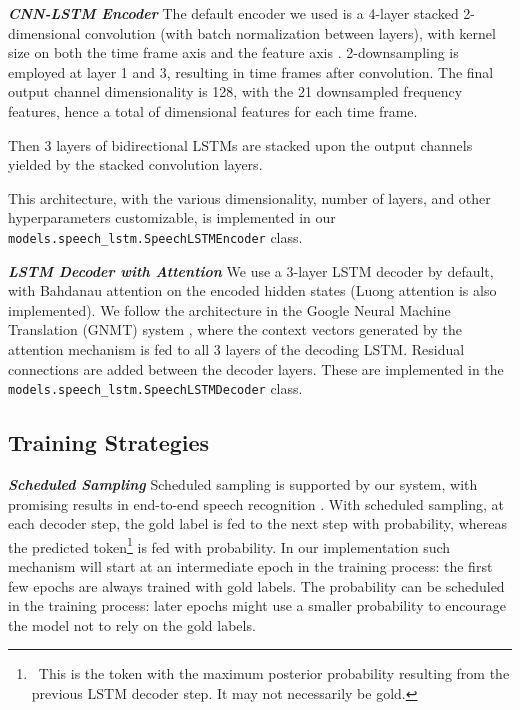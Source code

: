 \documentclass{article}
\begin{document}
\vspace{0.2cm}
\noindent \textbf{\textit{CNN-LSTM Encoder}}\quad
\label{sec:lstm_encoder}
The default encoder we used is a 4-layer stacked 2-dimensional convolution (with batch normalization between layers), with kernel size  on both the time frame axis and the feature axis \cite{zhang2017very,watanabe2018espnet}. 2-downsampling is employed at layer 1 and 3, resulting in  time frames after convolution. The final output channel dimensionality is 128, with the 21 downsampled frequency features, hence a total of  dimensional features for each time frame.

Then 3 layers of bidirectional LSTMs \cite{graves2005bidirectional} are stacked  upon the output channels yielded by the stacked convolution layers.

This architecture, with the various dimensionality, number of layers, and other hyperparameters customizable, is implemented in our \texttt{models.speech\_lstm.SpeechLSTMEncoder} class.

\vspace{0.2cm}
\noindent \textbf{\textit{LSTM Decoder with Attention}}\quad
\label{sec:lstm_decoder}
We use a 3-layer LSTM decoder by default, with Bahdanau attention \cite{bahdanau2015neural} on the encoded hidden states (Luong attention \cite{luong2015effective} is also implemented). We follow the architecture in the Google Neural Machine Translation (GNMT) system \cite{gnmt}, where the context vectors generated by the attention mechanism is fed to all 3 layers of the decoding LSTM. Residual connections \cite{he2016deep} are added between the decoder layers. These are implemented in the \texttt{models.speech\_lstm.SpeechLSTMDecoder} class.

\subsection{Training Strategies}




\vspace{0.2cm}
\noindent \textbf{\textit{Scheduled Sampling}}\quad
Scheduled sampling \cite{bengio2015scheduled} is supported by our system, with promising results in end-to-end speech recognition \cite{baskar2019promising}. With scheduled sampling, at each decoder step, the gold label is fed to the next step with  probability, whereas the predicted token\footnote{~This is the token with the maximum posterior probability resulting from the previous LSTM decoder step. It may not necessarily be gold.} is fed with  probability. In our implementation such mechanism will start at an intermediate epoch  in the training process: the first few epochs are always trained with gold labels. The probability  can be scheduled in the training process: later epochs might use a smaller probability to encourage the model not to rely on the gold labels.
\end{document}
